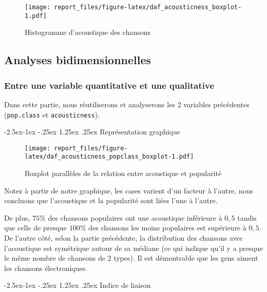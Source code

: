 \documentclass[
  12pt,
]{article}
\makeatletter
\renewcommand\paragraph{\@startsection{paragraph}{4}{\z@}%
        {-2.5ex\@plus -1ex \@minus -.25ex}%
        {1.25ex \@plus .25ex}%
        {\normalfont\normalsize\bfseries}}
\makeatother
\begin{document}
\begin{figure}
\centering
\texttt{[image: report\_files/figure-latex/daf\_acousticness\_boxplot-1.pdf]}
\caption{Histogramme d'acoustique des chansons}
\end{figure}

\hypertarget{analyses-bidimensionnelles}{%
\subsection{Analyses
bidimensionnelles}\label{analyses-bidimensionnelles}}

\hypertarget{entre-une-variable-quantitative-et-une-qualitative}{%
\subsubsection{Entre une variable quantitative et une
qualitative}\label{entre-une-variable-quantitative-et-une-qualitative}}

Dans cette partie, nous réutiliserons et analyserons les 2 variables
précédentes (\texttt{pop.class} et \texttt{acousticness}).

\hypertarget{repruxe9sentation-graphique}{%
\paragraph{Représentation graphique}\label{repruxe9sentation-graphique}}

\begin{figure}
\centering
\texttt{[image: report\_files/figure-latex/daf\_acousticness\_popclass\_boxplot-1.pdf]}
\caption{Boxplot parallèles de la relation entre acoustique et
popularité}
\end{figure}

Notez à partir de notre graphique, les cases varient d'un facteur à
l'autre, nous concluons que l'acoustique et la popularité sont liées
l'une à l'autre.

De plus, \(75\%\) des chansons populaires ont une acoustique inférieure
à \(0,5\) tandis que celle de presque \(100\%\) des chansons les moins
populaires est supérieure à \(0,5\). De l'autre côté, selon la partie
précédente, la distribution des chansons avec l'acoustique est
symétrique autour de sa médiane (ce qui indique qu'il y a presque le
même nombre de chansons de 2 types). Il est démontrable que les gens
aiment les chansons électroniques.

\hypertarget{indice-de-liaison}{%
\paragraph{Indice de liaison}\label{indice-de-liaison}}
\end{document}
